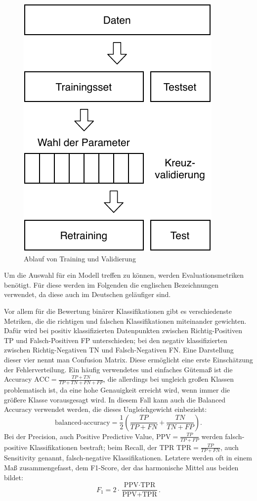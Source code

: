 	\begin{figure}[H]
		\centering
		\includegraphics[scale=1]{pic/validation-ablauf.pdf}
		\caption{Ablauf von Training und Validierung}
		\label{fig:validation-ablauf}
	\end{figure}
	
	Um die Auswahl für ein Modell treffen zu können, werden Evaluationsmetriken benötigt. Für diese werden im Folgenden die englischen Bezeichnungen verwendet, da diese auch im Deutschen geläufiger sind.
	
	Vor allem für die Bewertung binärer Klassifikationen gibt es verschiedenste Metriken, die die richtigen und falschen Klassifikationen miteinander gewichten. Dafür wird bei positiv klassifizierten Datenpunkten zwischen Richtig-Positiven TP und Falsch-Positiven FP unterschieden; bei den negativ klassifizierten zwischen Richtig-Negativen TN und Falsch-Negativen FN. Eine Darstellung dieser vier nennt man Confusion Matrix. Diese ermöglicht eine erste Einschätzung der Fehlerverteilung. Ein häufig verwendetes und einfaches Gütemaß ist die Accuracy $\text{ACC} = \frac{TP + TN}{TP + TN + FN + FP}$, die allerdings bei ungleich großen Klassen problematisch ist, da eine hohe Genauigkeit erreicht wird, wenn immer die größere Klasse vorausgesagt wird. In diesem Fall kann auch die Balanced Accuracy verwendet werden, die dieses Ungleichgewicht einbezieht:
	\[
		\text{balanced-accuracy} = \frac{1}{2}\left( \frac{TP}{TP + FN} + \frac{TN}{TN + FP}\right).
	\]
	 Bei der Precision, auch Positive Predictive Value, $\text{PPV} = \frac{TP}{TP + FP}$ werden falsch-positive Klassifikationen \glqq bestraft\grqq{}; beim Recall, der \acl{TPR} $\text{TPR} = \frac{TP}{TP + FN}$, auch Sensitivity genannt, falsch-negative Klassifikationen. Letztere werden oft in einem Maß zusammengefasst, dem F1-Score, der das harmonische Mittel aus beiden bildet:
	\[
		F_1 = 2 \cdot \frac{\text{PPV} \cdot \text{TPR}}{\text{PPV} + \text{TPR}}.
	\]
	
